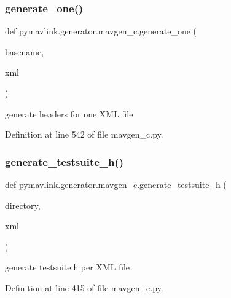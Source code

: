 \subsubsection{\texorpdfstring{generate\_one()}{generate\_one()}}
{\footnotesize\ttfamily def pymavlink.\+generator.\+mavgen\+\_\+c.\+generate\+\_\+one (\begin{DoxyParamCaption}\item[{}]{basename,  }\item[{}]{xml }\end{DoxyParamCaption})}

\begin{DoxyVerb}generate headers for one XML file\end{DoxyVerb}
 

Definition at line 542 of file mavgen\+\_\+c.\+py.

\mbox{\label{namespacepymavlink_1_1generator_1_1mavgen__c_a0e011b90c365fd8dcb174271880c26e0}} 
\subsubsection{\texorpdfstring{generate\_testsuite\_h()}{generate\_testsuite\_h()}}
{\footnotesize\ttfamily def pymavlink.\+generator.\+mavgen\+\_\+c.\+generate\+\_\+testsuite\+\_\+h (\begin{DoxyParamCaption}\item[{}]{directory,  }\item[{}]{xml }\end{DoxyParamCaption})}

\begin{DoxyVerb}generate testsuite.h per XML file\end{DoxyVerb}
 

Definition at line 415 of file mavgen\+\_\+c.\+py.

\mbox{\label{namespacepymavlink_1_1generator_1_1mavgen__c_a205f217ad0dbb66616d4b22cd91e6d5e}} 
